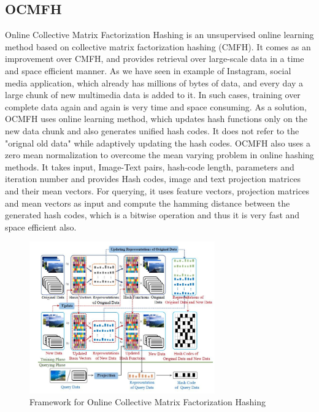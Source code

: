\documentclass[10pt]{scrartcl}
\begin{document}
\subsection{OCMFH}
Online Collective Matrix Factorization Hashing is an unsupervised online learning method based on collective matrix factorization hashing (CMFH). It comes as an improvement over CMFH, and provides retrieval over large-scale data in a time and space efficient manner. As we have seen in example of Instagram, social media application, which already has millions of bytes of data, and every day a large chunk of new multimedia data is added to it. In such cases, training over complete data again and again is very time and space consuming. As a solution, OCMFH uses online learning method, which updates hash functions only on the new data chunk and also generates unified hash codes. It does not refer to the "orignal old data" while adaptively updating the hash codes. OCMFH also uses a zero mean normalization to overcome the mean varying problem in online hashing methods. It takes input, Image-Text pairs, hash-code length, parameters and iteration number and provides Hash codes, image and text projection matrices and their mean vectors. For querying, it uses feature vectors, projection matrices and mean vectors as input and compute the hamming distance between the generated hash codes, which is a bitwise operation and thus it is very fast and space efficient also. 
 

\begin{figure}
    \centering
    \includegraphics[width=8cm]{OCMFH.JPG}
    \caption{Framework for Online Collective Matrix Factorization Hashing}
\end{figure}
\end{document}
